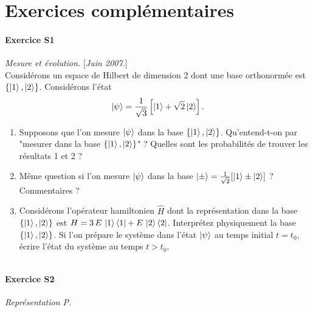 \section*{Exercices complémentaires}
\vspace{10pt}

\paragraph{Exercice S1} \textit{Mesure et évolution.} \hfill
[\textit{Juin 2007.}] \\
Considérons un espace de Hilbert de dimension $2$ dont une base orthonormée est $\lbrace\ket{1},\ket{2}\rbrace$. Considérons l'état
\begin{equation}
\ket{\psi} = \frac{1}{\sqrt{3}}\left[ \ket{1} + \sqrt{2}\ket{2}\right].
\end{equation}
\begin{enumerate}
\item Supposons que l'on mesure $\ket{\psi}$ dans la base $\lbrace \ket{1},\ket{2}\rbrace$. Qu'entend-t-on par "mesurer dans la base $\lbrace \ket{1},\ket{2}\rbrace$" ? Quelles sont les probabilités de trouver les résultats 1 et 2 ?
\item Même question si l'on mesure $\ket{\psi}$ dans la base $\ket{\pm} = \frac{1}{\sqrt{2}} [\ket{1}\pm\ket{2}]$ ? Commentaires ?
\item Considérons l'opérateur hamiltonien $\hat H$ dont la représentation dans la base $\lbrace\ket{1},\ket{2}\rbrace$ est $H = 3\, E\, \ket{1}\bra{1} + E\, \ket{2}\bra{2}$. Interprétez physiquement la base $\lbrace\ket{1},\ket{2}\rbrace$. Si l'on prépare le système dans l'état $\ket{\psi}$ au temps initial $t = t_0$, écrire l'état du système au temps $t > t_0$.
\end{enumerate}
$ $

\paragraph{Exercice S2} \textit{Représentation P.} 

